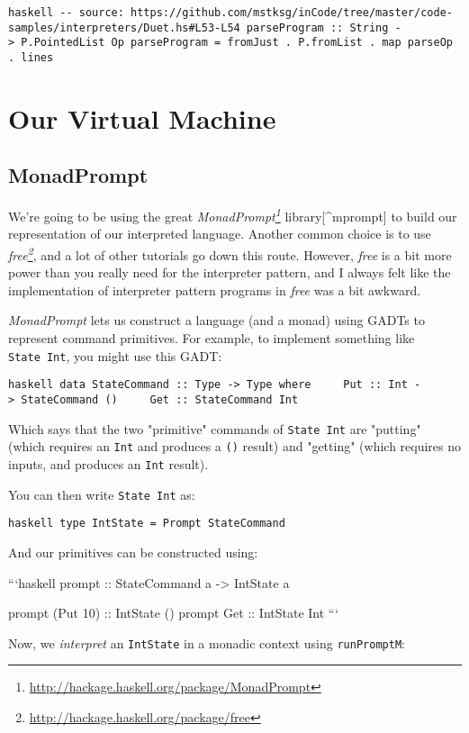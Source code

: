 \documentclass[]{article}
\renewcommand{\href}[2]{#2\footnote{\url{#1}}}
\begin{document}
\texttt{haskell\ -\/-\ source:\ https://github.com/mstksg/inCode/tree/master/code-samples/interpreters/Duet.hs\#L53-L54\ parseProgram\ ::\ String\ -\textgreater{}\ P.PointedList\ Op\ parseProgram\ =\ fromJust\ .\ P.fromList\ .\ map\ parseOp\ .\ lines}

\section{Our Virtual Machine}

\subsection{MonadPrompt}

We're going to be using the great
\emph{\href{http://hackage.haskell.org/package/MonadPrompt}{MonadPrompt}}
library{[}\^{}mprompt{]} to build our representation of our interpreted
language. Another common choice is to use
\emph{\href{http://hackage.haskell.org/package/free}{free}}, and a lot of other
tutorials go down this route. However, \emph{free} is a bit more power than you
really need for the interpreter pattern, and I always felt like the
implementation of interpreter pattern programs in \emph{free} was a bit awkward.

\emph{MonadPrompt} lets us construct a language (and a monad) using GADTs to
represent command primitives. For example, to implement something like
\texttt{State\ Int}, you might use this GADT:

\texttt{haskell\ data\ StateCommand\ ::\ Type\ -\textgreater{}\ Type\ where\ \ \ \ \ Put\ ::\ Int\ -\textgreater{}\ StateCommand\ ()\ \ \ \ \ Get\ ::\ StateCommand\ Int}

Which says that the two "primitive" commands of \texttt{State\ Int} are
"putting" (which requires an \texttt{Int} and produces a \texttt{()} result) and
"getting" (which requires no inputs, and produces an \texttt{Int} result).

You can then write \texttt{State\ Int} as:

\texttt{haskell\ type\ IntState\ =\ Prompt\ StateCommand}

And our primitives can be constructed using:

```haskell prompt :: StateCommand a -\textgreater{} IntState a

prompt (Put 10) :: IntState () prompt Get :: IntState Int ```

Now, we \emph{interpret} an \texttt{IntState} in a monadic context using
\texttt{runPromptM}:
\end{document}
